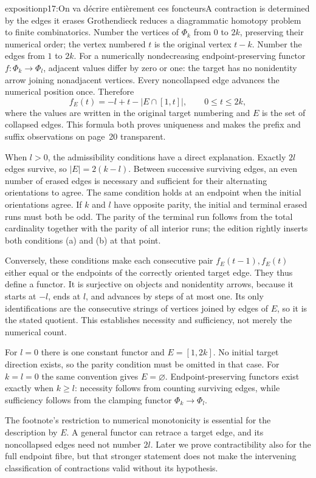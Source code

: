 \begin{dcomment}{exposition}{p17:On va décrire entièrement ces foncteurs}{A contraction is determined by the edges it erases}
Grothendieck reduces a diagrammatic homotopy problem to finite combinatorics. Number the vertices of $\Phi_k$ from $0$ to $2k$, preserving their numerical order; the vertex numbered $t$ is the original vertex $t-k$. Number the edges from $1$ to $2k$. For a numerically nondecreasing endpoint-preserving functor $f:\Phi_k\to\Phi_l$, adjacent values differ by zero or one: the target has no nonidentity arrow joining nonadjacent vertices. Every noncollapsed edge advances the numerical position once. Therefore
\[
 f_E(t)=-l+t-\bigl|E\cap[1,t]\bigr|,
 \qquad 0\leq t\leq2k,
\]
where the values are written in the original target numbering and $E$ is the set of collapsed edges. This formula both proves uniqueness and makes the prefix and suffix observations on page~20 transparent.

When $l>0$, the admissibility conditions have a direct explanation. Exactly $2l$ edges survive, so $|E|=2(k-l)$. Between successive surviving edges, an even number of erased edges is necessary and sufficient for their alternating orientations to agree. The same condition holds at an endpoint when the initial orientations agree. If $k$ and $l$ have opposite parity, the initial and terminal erased runs must both be odd. The parity of the terminal run follows from the total cardinality together with the parity of all interior runs; the edition rightly inserts both conditions (a) and (b) at that point.

Conversely, these conditions make each consecutive pair $f_E(t-1),f_E(t)$ either equal or the endpoints of the correctly oriented target edge. They thus define a functor. It is surjective on objects and nonidentity arrows, because it starts at $-l$, ends at $l$, and advances by steps of at most one. Its only identifications are the consecutive strings of vertices joined by edges of $E$, so it is the stated quotient. This establishes necessity and sufficiency, not merely the numerical count.

For $l=0$ there is one constant functor and $E=[1,2k]$. No initial target direction exists, so the parity condition must be omitted in that case. For $k=l=0$ the same convention gives $E=\varnothing$. Endpoint-preserving functors exist exactly when $k\geq l$: necessity follows from counting surviving edges, while sufficiency follows from the clamping functor $\Phi_k\to\Phi_l$.

The footnote's restriction to numerical monotonicity is essential for the description by $E$. A general functor can retrace a target edge, and its noncollapsed edges need not number $2l$. Later we prove contractibility also for the full endpoint fibre, but that stronger statement does not make the intervening classification of contractions valid without its hypothesis.


\end{dcomment}
